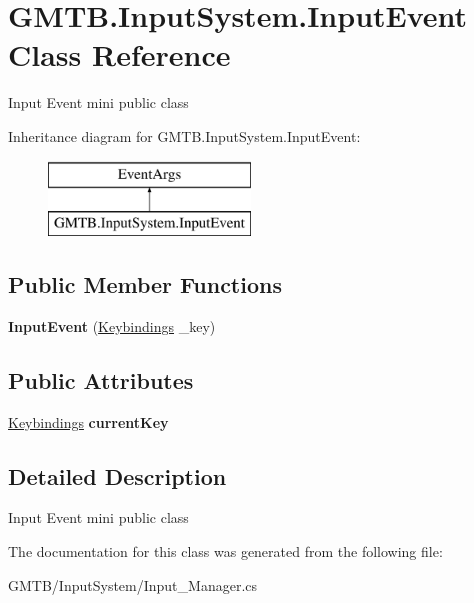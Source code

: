 \hypertarget{class_g_m_t_b_1_1_input_system_1_1_input_event}{}\section{G\+M\+T\+B.\+Input\+System.\+Input\+Event Class Reference}
\label{class_g_m_t_b_1_1_input_system_1_1_input_event}


Input Event mini public class  


Inheritance diagram for G\+M\+T\+B.\+Input\+System.\+Input\+Event\+:\begin{figure}[H]
\begin{center}
\leavevmode
\includegraphics[height=2.000000cm]{class_g_m_t_b_1_1_input_system_1_1_input_event}
\end{center}
\end{figure}
\subsection*{Public Member Functions}
\begin{DoxyCompactItemize}
\item 
\mbox{\label{class_g_m_t_b_1_1_input_system_1_1_input_event_aff3bb731571bfe0add39633a5faf4684}} 
{\bfseries Input\+Event} (\mbox{\hyperlink{namespace_g_m_t_b_1_1_input_system_a29c73b630f79093ef12619656209d6c1}{Keybindings}} \+\_\+key)
\end{DoxyCompactItemize}
\subsection*{Public Attributes}
\begin{DoxyCompactItemize}
\item 
\mbox{\label{class_g_m_t_b_1_1_input_system_1_1_input_event_aeb5c303c448146e85b0279f59176b267}} 
\mbox{\hyperlink{namespace_g_m_t_b_1_1_input_system_a29c73b630f79093ef12619656209d6c1}{Keybindings}} {\bfseries current\+Key}
\end{DoxyCompactItemize}


\subsection{Detailed Description}
Input Event mini public class 



The documentation for this class was generated from the following file\+:\begin{DoxyCompactItemize}
\item 
G\+M\+T\+B/\+Input\+System/Input\+\_\+\+Manager.\+cs\end{DoxyCompactItemize}
